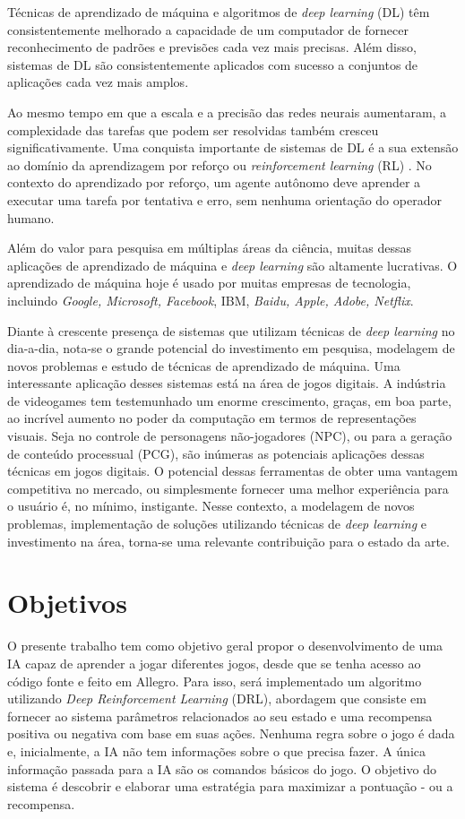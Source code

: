 Técnicas de aprendizado de máquina e algoritmos de \textit{deep learning} (DL) têm consistentemente melhorado a capacidade de um computador de fornecer reconhecimento de padrões e previsões cada vez mais precisas. Além disso, sistemas de DL são consistentemente aplicados com sucesso a conjuntos de aplicações cada vez mais amplos.

Ao mesmo tempo em que a escala e a precisão das redes neurais aumentaram, a complexidade das tarefas que podem ser resolvidas também cresceu significativamente. 
Uma conquista importante de sistemas de DL é a sua extensão ao domínio da aprendizagem por reforço ou \textit{reinforcement learning} (RL) \cite{reinforcement-learning-intro-2018}. No contexto do aprendizado por reforço, um agente autônomo deve aprender a executar uma tarefa por tentativa e erro, sem nenhuma orientação do operador humano. 

Além do valor para pesquisa em múltiplas áreas da ciência, muitas dessas aplicações de aprendizado de máquina e \textit{deep learning} são altamente lucrativas. O aprendizado de máquina hoje é usado por muitas empresas de tecnologia, incluindo \textit{Google, Microsoft, Facebook}, IBM, \textit{Baidu, Apple, Adobe, Netflix}.

Diante à crescente presença de sistemas que utilizam técnicas de \textit{deep learning} no dia-a-dia, nota-se o grande potencial do investimento em pesquisa, modelagem de novos problemas e estudo de técnicas de aprendizado de máquina. 
%
Uma interessante aplicação desses sistemas está na área de jogos digitais. A indústria de videogames tem testemunhado um enorme crescimento, graças, em boa parte, ao incrível aumento no poder da computação em termos de representações visuais. 
%
%
Seja no controle de personagens não-jogadores (NPC), ou para a geração de conteúdo processual (PCG), são inúmeras as potenciais aplicações dessas técnicas em jogos digitais.
%
O potencial dessas ferramentas de obter uma vantagem competitiva no mercado, ou simplesmente fornecer uma melhor experiência para o usuário é, no mínimo, instigante.
%
Nesse contexto, a modelagem de novos problemas, implementação de soluções utilizando técnicas de \textit{deep learning} e investimento na área, torna-se uma relevante contribuição para o estado da arte.


\section{Objetivos}
 O presente trabalho tem como objetivo geral propor o desenvolvimento de uma IA capaz de aprender a jogar diferentes jogos, desde que se tenha acesso ao código fonte e feito em Allegro. Para isso, será implementado um algoritmo utilizando \textit{Deep Reinforcement Learning} (DRL), abordagem que consiste em fornecer ao sistema parâmetros relacionados ao seu estado e uma recompensa positiva ou negativa com base em suas ações. 
 Nenhuma regra sobre o jogo é dada e, inicialmente, a IA não tem informações sobre o que precisa fazer. A única informação passada para a IA são os comandos básicos do jogo. 
 O objetivo do sistema é descobrir e elaborar uma estratégia para maximizar a pontuação - ou a recompensa.

